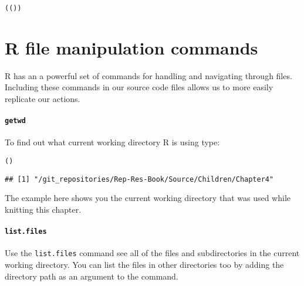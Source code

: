 {\begin{knitrout}
\color{fgcolor}\begin{kframe}
\begin{alltt}
(())
\end{alltt}
\end{kframe}
\end{knitrout}



\section{R file manipulation commands}

R has an a powerful set of commands for handling and navigating through files. Including these commands in our source code files allows us to more easily replicate our actions.

\paragraph{{\tt{getwd}}}

To find out what current working directory R is using type:

\begin{knitrout}
\color{fgcolor}\begin{kframe}
\begin{alltt}
()
\end{alltt}
\begin{verbatim}
## [1] "/git_repositories/Rep-Res-Book/Source/Children/Chapter4"
\end{verbatim}
\end{kframe}
\end{knitrout}


\noindent The example here shows you the current working directory that was used while knitting this chapter.

\paragraph{{\tt{list.files}}}

Use the \texttt{list.files} command see all of the files and subdirectories in the current working directory. You can list the files in other directories too by adding the directory path as an argument to the command.  

}
